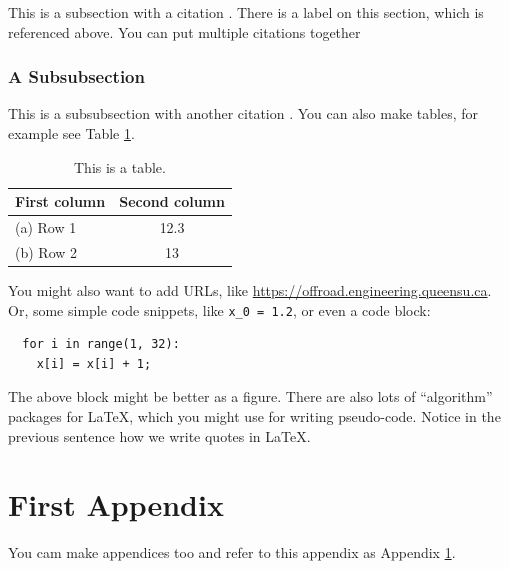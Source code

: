 \documentclass[12pt,letterpaper,fleqn,oneside]{qu-handout}
\newcommand*{\mintpy}[1]{\texttt{#1}}
\begin{document}
This is a subsection with a citation \cite{Ogata:2001aa}.  There is a label on this section, which is referenced above.  You can put multiple citations together \cite{Marshall:2004aa,Ogata:2001aa}

\subsubsection{A Subsubsection}

This is a subsubsection with another citation \cite[p.\ 1964]{Marshall:2004aa}.  You can also make tables, for example see Table \ref{tbl:example}.

\begin{table}
  \caption{This is a table.}
  \begin{center}
    \begin{tabular}{lc}
      \toprule
      \bf First column & \bf Second column \\ \midrule
      (a) Row 1 & 12.3 \\
      (b) Row 2 & 13 \\
      \bottomrule
    \end{tabular}
  \end{center}
  \label{tbl:example}
\end{table}%

You might also want to add URLs, like \url{https://offroad.engineering.queensu.ca}.  Or, some simple code snippets, like  \mintpy{x_0 = 1.2}, or even a code block:
\begin{verbatim}
  for i in range(1, 32):
    x[i] = x[i] + 1;
\end{verbatim}
The above block might be better as a figure.  There are also lots of ``algorithm'' packages for LaTeX, which you might use for writing pseudo-code.  Notice in the previous sentence how we write quotes in \LaTeX.






\appendix

\section{First Appendix}
\label{sec:appendix}

You cam make appendices too and refer to this appendix as Appendix \ref{sec:appendix}.

\end{document}
